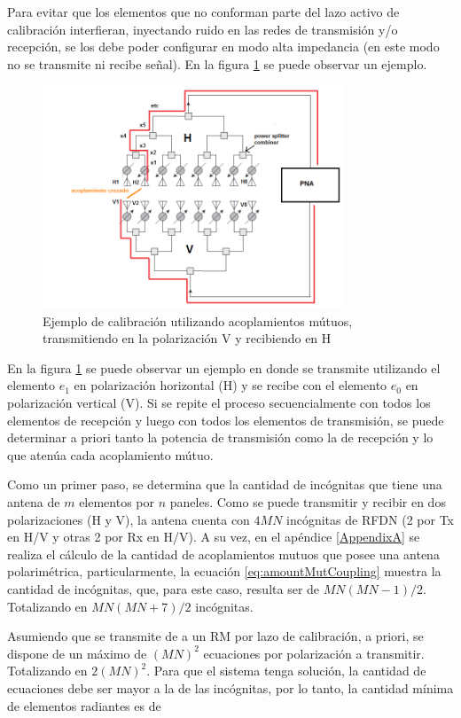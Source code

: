 Para evitar que los elementos que no conforman parte del lazo activo de calibración interfieran, inyectando ruido en las redes 
de transmisión y/o recepción, se los debe poder configurar en modo alta impedancia (en este modo no se transmite ni recibe 
señal). En la figura \ref{fig:mutual_general} se puede observar un ejemplo.

\begin{figure}[H]
 \centering
 \includegraphics[width=9cm]{gfx/mutualCouplingExample.png}
 \caption{Ejemplo de calibración utilizando acoplamientos mútuos, transmitiendo en la polarización V y recibiendo en H}
 \label{fig:mutual_general}
\end{figure}

En la figura \ref{fig:mutual_general} se puede observar un ejemplo en donde se transmite utilizando el elemento $e_1$ en
polarización horizontal (H) y se recibe con el elemento $e_0$ en polarización vertical (V). Si se repite el proceso
secuencialmente con todos los elementos de recepción y luego con todos los elementos de transmisión, se puede determinar a
priori tanto la potencia de transmisión como la de recepción y lo que atenúa cada acoplamiento mútuo.

Como un primer paso, se determina que la cantidad de incógnitas que tiene una antena de $m$ elementos por $n$ paneles. Como
se puede transmitir y recibir en dos polarizaciones (H y V), la antena cuenta con $4MN$ incógnitas de RFDN (2 por Tx en H/V y
otras 2 por Rx en H/V). A su vez, en el apéndice \ref{AppendixA} se realiza el cálculo de la cantidad de acoplamientos mutuos
que posee una antena polarimétrica, particularmente, la ecuación \ref{eq:amountMutCoupling} muestra la cantidad de
incógnitas, que, para este caso, resulta ser de $MN(MN-1)/2$. Totalizando en $MN(MN + 7)/2$ incógnitas.

Asumiendo que se transmite de a un RM por lazo de calibración, a priori, se dispone de un máximo de $(MN)^2$ ecuaciones por
polarización a transmitir. Totalizando en $2(MN)^2$. Para que el sistema tenga solución, la cantidad de ecuaciones debe ser
mayor a la de las incógnitas, por lo tanto, la cantidad mínima de elementos radiantes es de

